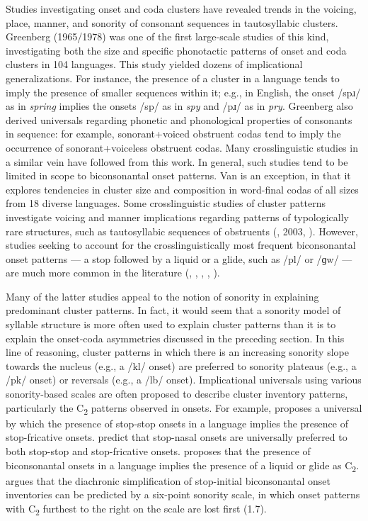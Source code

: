   Studies investigating onset and coda clusters have revealed trends in the voicing, place, manner, and sonority of consonant sequences in tautosyllabic clusters. Greenberg (1965/1978) was one of the first large-scale studies of this kind, investigating both the size and specific phonotactic patterns of onset and coda clusters in 104 languages. This study yielded dozens of implicational generalizations. For instance, the presence of a cluster in a language tends to imply the presence of smaller sequences within it; e.g., in English, the onset /spɹ/ as in \textit{spring} implies the onsets /sp/ as in \textit{spy} and /pɹ/ as in \textit{pry}. Greenberg also derived universals regarding phonetic and phonological properties of consonants in sequence: for example, sonorant+voiced obstruent codas tend to imply the occurrence of sonorant+voiceless obstruent codas. Many crosslinguistic studies in a similar vein have followed from this work. In general, such studies tend to be limited in scope to biconsonantal onset patterns. Van\citet{Dam2004} is an exception, in that it explores tendencies in cluster size and composition in word-final codas of all sizes from 18 diverse languages. Some crosslinguistic studies of cluster patterns investigate voicing and manner implications regarding patterns of typologically rare structures, such as tautosyllabic sequences of obstruents (\citealt{Morelli1999}, 2003, \citealt{Kreitman2008}). However, studies seeking to account for the crosslinguistically most frequent biconsonantal onset patterns — a stop followed by a liquid or a glide, such as /pl/ or /ɡw/ — are much more common in the literature (\citealt{Clements1990}, \citealt{BerentEtAl2008}, \citealt{BerentEtAl2011}, \citealt{Parker2012}, \citealt{Vennemann2012}). 



  Many of the latter studies appeal to the notion of sonority in explaining predominant cluster patterns. In fact, it would seem that a sonority model of syllable structure is more often used to explain cluster patterns than it is to explain the onset-coda asymmetries discussed in the preceding section. In this line of reasoning, cluster patterns in which there is an increasing sonority slope towards the nucleus (e.g., a /kl/ onset) are preferred to sonority plateaus (e.g., a /pk/ onset) or reversals (e.g., a /lb/ onset). Implicational universals using various sonority-based scales are often proposed to describe cluster inventory patterns, particularly the C\textsubscript{2} patterns observed in onsets. For example, \citet{Morelli1999} proposes a universal by which the presence of stop-stop onsets in a language implies the presence of stop-fricative onsets. \citet{LennertzBerent2015} predict that stop-nasal onsets are universally preferred to both stop-stop and stop-fricative onsets. \citet{Parker2012} proposes that the presence of biconsonantal onsets in a language implies the presence of a liquid or glide as C\textsubscript{2}. \citet{Vennemann2012} argues that the diachronic simplification of stop-initial biconsonantal onset inventories can be predicted by a six-point sonority scale, in which onset patterns with C\textsubscript{2} furthest to the right on the scale are lost first (1.7).



